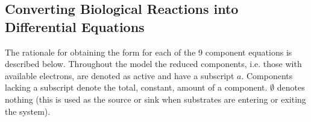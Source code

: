 
\subsection{Converting Biological Reactions into Differential Equations}
The rationale for obtaining the form for each of the 9 component equations is described below. Throughout the model the reduced components, i.e. those with available electrons, are denoted as active and have a subscript $a$. Components lacking a subscript denote the total, constant, amount of a component. $\emptyset$ denotes nothing (this is used as the source or sink when substrates are entering or exiting the system).

